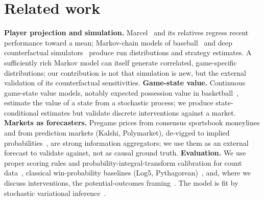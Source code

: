 \documentclass[10pt,twocolumn]{article}
\begin{document}
\section{Related work}
\textbf{Player projection and simulation.} Marcel~\cite{tango} and its relatives regress recent
performance toward a mean; Markov-chain models of baseball~\cite{bukiet} and deep counterfactual
simulators~\cite{nakahara} produce run distributions and strategy estimates. A sufficiently rich Markov
model can itself generate correlated, game-specific distributions; our contribution is not that
simulation is new, but the external validation of its counterfactual sensitivities.
\textbf{Game-state value.} Continuous game-state value models, notably expected possession value in
basketball~\cite{cervone}, estimate the value of a state from a stochastic process; we produce
state-conditional estimates but validate discrete interventions against a market.
\textbf{Markets as forecasters.} Pregame prices from consensus sportsbook moneylines and from
prediction markets (Kalshi, Polymarket), de-vigged to implied probabilities~\cite{strumbelj}, are
strong information aggregators; we use them as an external forecast to validate against, not as causal
ground truth.
\textbf{Evaluation.} We use proper scoring rules and probability-integral-transform calibration for
count data~\cite{gneiting,czado}, classical win-probability baselines (Log5, Pythagorean)~\cite{james},
and, where we discuss interventions, the potential-outcomes framing~\cite{imbens}. The model is fit by
stochastic variational inference~\cite{hoffman,phan,jax}.
\end{document}
